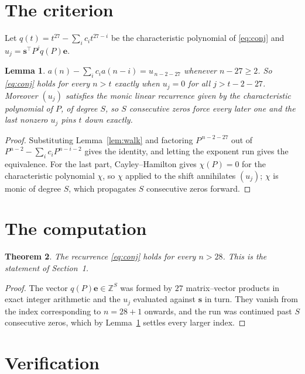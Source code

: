 \documentclass[11pt,a4paper]{article}
\theoremstyle{plain}
\newtheorem{theorem}{Theorem}
\newtheorem{lemma}[theorem]{Lemma}
\theoremstyle{definition}
\begin{document}
\section{The criterion}

Let $q(t)=t^{27}-\sum_i c_i t^{27-i}$ be the characteristic polynomial of
\eqref{eq:conj} and $u_j=\mathbf{s}^{\!\top}P^{j}q(P)\mathbf{e}$.

\begin{lemma}\label{lem:crit}
$a(n)-\sum_i c_i a(n-i)=u_{\,n-2-27}$ whenever $n-27\ge2$. So \eqref{eq:conj}
holds for every $n>t$ exactly when $u_j=0$ for all $j>t-2-27$. Moreover $(u_j)$
satisfies the monic linear recurrence given by the characteristic polynomial of $P$, of
degree $S$, so $S$ consecutive zeros force every later one and the last nonzero $u_j$ pins
$t$ down exactly.
\end{lemma}

\begin{proof}
Substituting Lemma~\ref{lem:walk} and factoring $P^{\,n-2-27}$ out of
$P^{n-2}-\sum_i c_i P^{n-i-2}$ gives the identity, and letting the exponent run gives the
equivalence. For the last part, Cayley--Hamilton gives $\chi(P)=0$ for the characteristic
polynomial $\chi$, so $\chi$ applied to the shift annihilates $(u_j)$; $\chi$ is monic of
degree $S$, which propagates $S$ consecutive zeros forward.
\end{proof}

\section{The computation}

\begin{theorem}
The recurrence \eqref{eq:conj} holds for every $n>28$. This is the statement of
Section~1.
\end{theorem}

\begin{proof}
The vector $q(P)\mathbf{e}\in\mathbb{Z}^{S}$ was formed by $27$ matrix--vector
products in exact integer arithmetic and the $u_j$ evaluated against $\mathbf{s}$ in turn.
They vanish from the index corresponding to $n=28+1$ onwards, and the run was continued
past $S$ consecutive zeros, which by Lemma~\ref{lem:crit} settles every larger index.
\end{proof}

\section{Verification}
\end{document}

